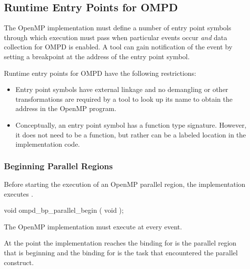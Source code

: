 \subsection{Runtime Entry Points for OMPD}
\label{subsec:runtime-entry-points-for-ompd}

The OpenMP implementation must define a number of entry point symbols
through which execution must pass when particular events occur
\emph{and} data collection for OMPD is enabled.
A tool can gain notification of the event by setting 
a breakpoint at the address of the entry point symbol.

\restrictions

Runtime entry points for OMPD have the following restrictions:
\begin{itemize}
\item Entry point symbols have external  linkage and no
demangling or other transformations are required by a tool
to look up its name to obtain the address in the OpenMP program.

\item Conceptually, an entry point symbol has a function type signature.
However, it does not need to be a function, but rather can be a labeled location
in the implementation code.
\end{itemize}



\subsubsection{Beginning Parallel Regions}
\label{subsubsec:ompd_bp_parallel_begin}

\summary

Before starting the execution of an OpenMP parallel region, the implementation executes
.

\format
\begin{cspecific}
\begin{ompSyntax}
void ompd_bp_parallel_begin ( void );
\end{ompSyntax}
\end{cspecific}


\descr

The OpenMP implementation must execute 
 at every  event.

At the point the implementation reaches 
the binding for  is the parallel 
region that is beginning and 
the binding for 
is the task that encountered the parallel construct.


